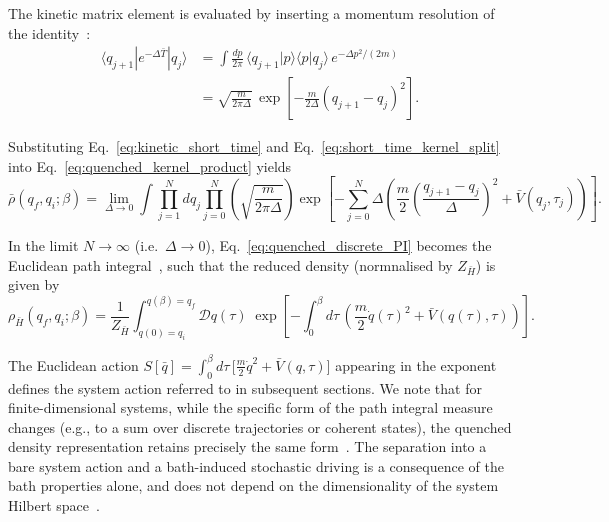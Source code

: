 The kinetic matrix element is evaluated by inserting a momentum resolution of
the identity~\cite{feynmanQuantumMechanicsPath1965,schulmanTechniquesApplicationsPath1981}:
\begin{align}
    \langle q_{j+1}|e^{-\Delta \bar T}|q_j\rangle
    &=
    \int \frac{dp}{2\pi}\,
    \langle q_{j+1}|p\rangle\langle p|q_j\rangle\,e^{-\Delta p^2/(2m)}
    \nonumber\\
    &=
    \sqrt{\frac{m}{2\pi\Delta}}\,
    \exp\!\left[-\frac{m}{2\Delta}(q_{j+1}-q_j)^2\right].
    \label{eq:kinetic_short_time}
\end{align}
\begin{widetext}
Substituting Eq.~\eqref{eq:kinetic_short_time} and Eq.~\eqref{eq:short_time_kernel_split} into
Eq.~\eqref{eq:quenched_kernel_product} yields
\begin{equation}
    \bar\rho(q_f,q_i;\beta)
    =
    \lim_{\Delta\to 0}
    \int \prod_{j=1}^{N} dq_j
    \prod_{j=0}^{N}
    \left(\sqrt{\frac{m}{2\pi\Delta}}\right)
    \exp\!\left[
        -\sum_{j=0}^{N}
        \Delta\left(
            \frac{m}{2}\left(\frac{q_{j+1}-q_j}{\Delta}\right)^2
            +\bar V(q_j,\tau_j)
        \right)
    \right].
    \label{eq:quenched_discrete_PI}
\end{equation}

In the limit $N\to\infty$ (i.e.\ $\Delta\to 0$), Eq.~\eqref{eq:quenched_discrete_PI} becomes the
Euclidean path integral~\cite{feynmanQuantumMechanicsPath1965,kleinertPathIntegralsQuantum2009,groscheHandbookFeynmanPath1998}, such that the reduced density (normnalised by $Z_{\bar H}$) is given by
\begin{equation}
    \rho_{\bar H}(q_f,q_i;\beta)
    =
    \frac{1}{Z_{\bar H}}
    \int_{q(0)=q_i}^{q(\beta)=q_f}\!\!\mathcal D q(\tau)\;
    \exp\!\left[
        -\int_0^\beta d\tau\,
        \left(
            \frac{m}{2}\dot q(\tau)^2+\bar V(q(\tau),\tau)
        \right)
    \right].
    \label{eq:quenched_continuum_PI}
\end{equation}
\end{widetext}
The Euclidean action $S[\bar q]=\int_0^\beta d\tau\,\big[\frac{m}{2}\dot q^2+\bar V(q,\tau)\big]$
appearing in the exponent defines the system action referred to in subsequent
sections. We note that for finite-dimensional systems, while the specific form of the path integral measure changes (e.g., to a sum over discrete trajectories or coherent states), the quenched density representation retains precisely the same form~\cite{weissQuantumDissipativeSystems2012, altlandCondensedMatterField2010}. The separation into a bare system action and a bath-induced stochastic driving is a consequence of the bath properties alone, and does not depend on the dimensionality of the system Hilbert space~\cite{leggettDynamicsDissipativeTwostate1987}.
